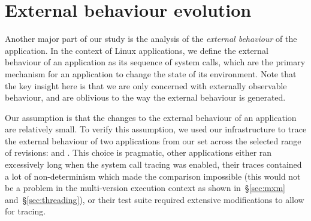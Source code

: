 \section{External behaviour evolution}
\label{evolution:external}


Another major part of our study is the analysis of the \emph{external
behaviour} of the application. In the context of Linux applications, we define
the external behaviour of an application as its sequence of system calls, which
are the primary mechanism for an application to change the state of its
environment.  Note that the key insight here is that we are only concerned with
externally observable behaviour, and are oblivious to the way the external
behaviour is generated.

Our assumption is that the changes to the external behaviour of an application
are relatively small. To verify this assumption, we used our infrastructure to
trace the external behaviour of two applications from our set across the
selected range of revisions: \lighttpd and \lighttpdtwo. This choice is
pragmatic, other applications either ran excessively long when the system call
tracing was enabled, their traces contained a lot of non-determinism which made
the comparison impossible (this would not be a problem in the multi-version
execution context as shown in~\S\ref{sec:mxm} and~\S\ref{sec:threading}), or
their test suite required extensive modifications to allow for tracing.


